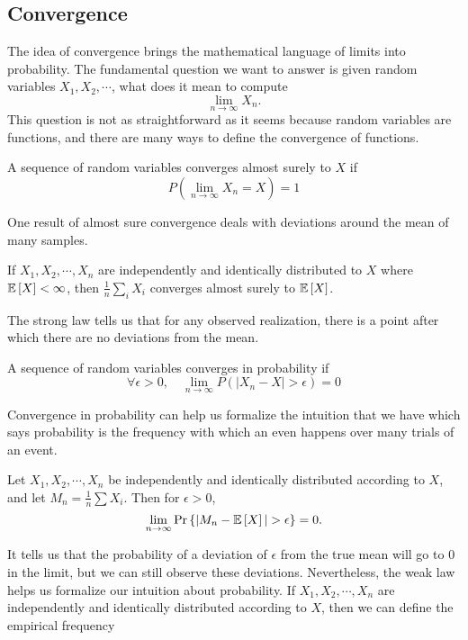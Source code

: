 \subsection{Convergence}
The idea of convergence brings the mathematical language of limits into probability.
The fundamental question we want to answer is given random variables $X_1, X_2, \cdots$, what does it mean to compute
\[
	\lim_{n\to\infty}X_n.
\]
This question is not as straightforward as it seems because random variables are functions, and there are many ways to define the convergence of functions.
\begin{definition}
	A sequence of random variables converges almost surely to $X$ if \[
		P\left(\lim_{n\to \infty}X_n = X\right) = 1
	\]
	\label{defn:almost-sure}
\end{definition}
One result of almost sure convergence deals with deviations around the mean of many samples.
\begin{theorem}
	If $X_1, X_2, \cdots, X_n$ are independently and identically distributed to $X$ where $\mathbb{E}\left[X\right] < \infty$, then $\frac{1}{n}\sum_i X_i$ converges almost surely to $\mathbb{E}\left[X\right]$.
	\label{thm:strong-law}
\end{theorem}
The strong law tells us that for any observed realization, there is a point after which there are no deviations from the mean.
\begin{definition}
	A sequence of random variables converges in probability if \[
		\forall \epsilon > 0, \quad \lim_{n\to\infty}P(|X_n - X| > \epsilon) = 0
	\]
	\label{defn:converge-prob}
\end{definition}
Convergence in probability can help us formalize the intuition that we have which says probability is the frequency with which an even happens over many trials of an event.
\begin{theorem}
  Let $X_1, X_2, \cdots, X_n$ be independently and identically distributed according to $X$, and let $M_n = \frac{1}{n}\sum X_i$.
  Then for $\epsilon > 0$, \[
	\lim_{n\to\infty} \text{Pr}\left\{|M_n - \mathbb{E}\left[X\right]| > \epsilon\right\} = 0.
  \]
  \label{thm:weak-law}
\end{theorem}
It tells us that the probability of a deviation of $\epsilon$ from the true mean will go to 0 in the limit, but we can still observe these deviations.
Nevertheless, the weak law helps us formalize our intuition about probability.
If $X_1, X_2, \cdots, X_n$ are independently and identically distributed according to $X$, then we can define the empirical frequency
